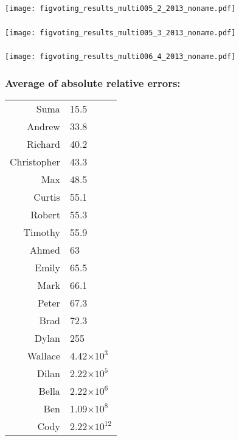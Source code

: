 \begin{frame}[plain]
  \frametitle{}

  \texttt{[image: figvoting\_results\_multi005\_2\_2013\_noname.pdf]}

\end{frame}

\begin{frame}[plain]
  \frametitle{}

  \texttt{[image: figvoting\_results\_multi005\_3\_2013\_noname.pdf]}

\end{frame}

\begin{frame}[plain]
  \frametitle{}

  \texttt{[image: figvoting\_results\_multi006\_4\_2013\_noname.pdf]}

\end{frame}


\begin{frame}
  \small
  \frametitle{Average of absolute relative errors:}

  \begin{tabular}{rl}
    Suma & 15.5 \\ 
    Andrew & 33.8 \\ 
    Richard & 40.2 \\ 
    Christopher & 43.3 \\ 
    Max & 48.5 \\ 
    Curtis & 55.1 \\ 
    Robert & 55.3 \\ 
    Timothy & 55.9 \\ 
    Ahmed &   63 \\ 
    Emily & 65.5 \\ 
    Mark & 66.1 \\ 
    Peter & 67.3 \\ 
    Brad & 72.3 \\ 
    Dylan &  255 \\ 
    Wallace & 4.42$\times$$10^{3}$ \\ 
    Dilan & 2.22$\times$$10^{5}$ \\ 
    Bella & 2.22$\times$$10^{6}$ \\ 
    Ben & 1.09$\times$$10^{8}$ \\ 
    Cody & 2.22$\times$$10^{12}$ \\ 
  \end{tabular}

\end{frame}



